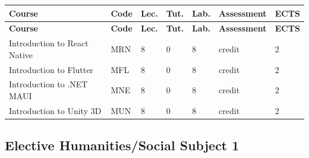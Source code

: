 \documentclass[12pt,a4paper]{article}
\newcommand{\thdrule}{\noalign{\global\setlength{\extrarowheight}{0pt}}}
\newcommand{\thdend}{\noalign{\global\setlength{\extrarowheight}{4pt}}}
\begin{document}
{\scriptsize
\begin{longtable}{m{5.5cm}m{0.8cm}m{1cm}m{1cm}m{1cm}m{1.7cm}m{0.7cm}}
\thdrule\toprule
\rowcolor{pjatkRed}
{\color{white}\footnotesize\textbf{\vphantom{Ag}Course}} & {\color{white}\footnotesize\textbf{\vphantom{Ag}Code}} & {\color{white}\footnotesize\textbf{\vphantom{Ag}Lec.}} & {\color{white}\footnotesize\textbf{\vphantom{Ag}Tut.}} & {\color{white}\footnotesize\textbf{\vphantom{Ag}Lab.}} & {\color{white}\footnotesize\textbf{\vphantom{Ag}Assessment}} & {\color{white}\footnotesize\textbf{\vphantom{Ag}ECTS}} \\
\midrule\thdend
\endfirsthead
\thdrule\toprule
\rowcolor{pjatkRed}
{\color{white}\footnotesize\textbf{\vphantom{Ag}Course}} & {\color{white}\footnotesize\textbf{\vphantom{Ag}Code}} & {\color{white}\footnotesize\textbf{\vphantom{Ag}Lec.}} & {\color{white}\footnotesize\textbf{\vphantom{Ag}Tut.}} & {\color{white}\footnotesize\textbf{\vphantom{Ag}Lab.}} & {\color{white}\footnotesize\textbf{\vphantom{Ag}Assessment}} & {\color{white}\footnotesize\textbf{\vphantom{Ag}ECTS}} \\
\midrule\thdend
\endhead
\rowcolor{tableRowLight} Introduction to React Native & MRN & 8 & 0 & 8 & {\scriptsize credit} & 2 \\
\rowcolor{tableRowAlt} Introduction to Flutter & MFL & 8 & 0 & 8 & {\scriptsize credit} & 2 \\
\rowcolor{tableRowLight} Introduction to .NET MAUI & MNE & 8 & 0 & 8 & {\scriptsize credit} & 2 \\
\rowcolor{tableRowAlt} Introduction to Unity 3D & MUN & 8 & 0 & 8 & {\scriptsize credit} & 2 \\
\bottomrule
\end{longtable}}

\subsection*{Elective Humanities/Social Subject 1}
\end{document}
